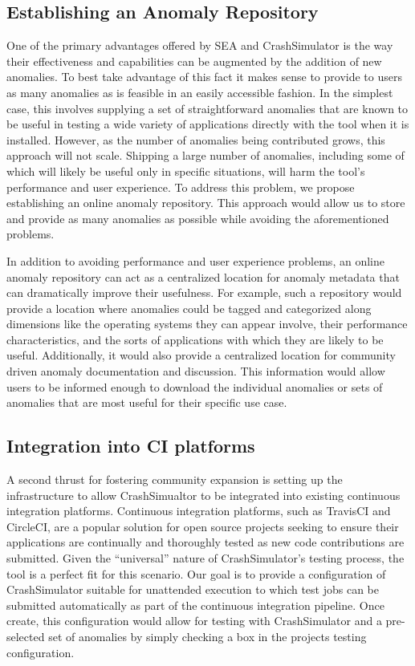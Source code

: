 \documentclass[twocolumn]{article}
\begin{document}
\subsection{Establishing an Anomaly Repository}

One of the primary advantages offered by SEA and CrashSimulator is the way
their effectiveness and capabilities can be augmented by the addition of
new anomalies.  To best take advantage of this fact it makes sense to
provide to users as many anomalies as is feasible in an easily accessible
fashion.  In the simplest case, this involves supplying a set of
straightforward anomalies that are known to be useful in testing a wide
variety of applications directly with the tool when it is installed.
However, as the number of anomalies being contributed grows, this approach
will not scale.  Shipping a large number of anomalies, including some of
which will likely be useful only in specific situations, will harm the
tool's performance and user experience.  To address this problem, we
propose establishing an online anomaly repository.  This approach would
allow us to  store and provide as many anomalies as possible while avoiding
the aforementioned problems.

In addition to avoiding performance and user experience problems, an online
anomaly repository can act as a centralized location for anomaly metadata
that can dramatically improve their usefulness. For example, such a
repository would provide a location where anomalies could be tagged and
categorized along dimensions like the operating systems they can appear
involve, their performance characteristics, and the sorts of applications
with which they are likely to be useful.  Additionally, it would also
provide a centralized location for community driven anomaly documentation
and discussion.  This information would allow users to be informed enough
to download the individual anomalies or sets of anomalies that are most
useful for their specific use case.


\subsection{Integration into CI platforms}

A second thrust for fostering community expansion is setting up the
infrastructure to allow CrashSimualtor to be integrated into existing
continuous integration platforms.  Continuous integration platforms, such
as TravisCI and CircleCI, are a popular solution for open source projects
seeking to ensure their applications are continually and thoroughly tested
as new code contributions are submitted.  Given the ``universal'' nature of
CrashSimulator's testing process, the tool is a perfect fit for this
scenario.  Our goal is to provide a configuration of CrashSimulator
suitable for unattended execution to which test jobs can be submitted
automatically as part of the continuous integration pipeline.  Once create,
this configuration would allow for testing with CrashSimulator and a
pre-selected set of anomalies by simply checking a box in the projects
testing configuration.
\end{document}
